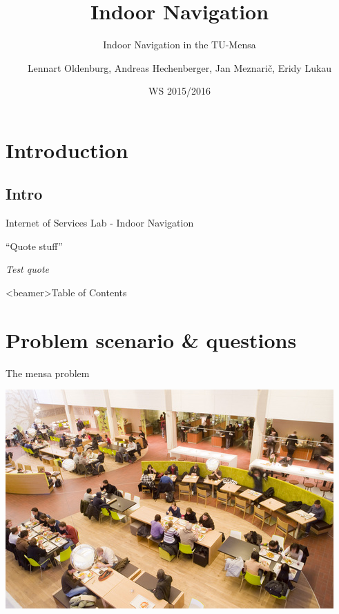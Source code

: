 \documentclass[9pt]{beamer}
\title[Internet of Services Lab]{Indoor Navigation}
\subtitle{Indoor Navigation in the TU-Mensa}
\author[Oldenburg, Hechenberger, Meznarič, Lukau]{Lennart Oldenburg, Andreas Hechenberger, Jan Meznarič, Eridy Lukau}
\institute[TU Berlin]{Department of Telecommunication Systems Service-centric Networking 
\\ Technische Universität Berlin}
\date[WS 2015/2016]{WS 2015/2016}
\newcommand{\englishQuote}[1]{``#1''}
\newcounter{currentOutline}
\begin{document}
\begin{frame}[plain]
	\titlepage
\end{frame}



\section*{Introduction} %

\subsection*{Intro}
\begin{frame}{Internet of Services Lab - Indoor Navigation}
	\begin{center}
	\englishQuote{Quote stuff}
\end{center}
	{\hfill\small\textit{Test quote} \cite{test:yeah}}
\end{frame}


\begin{frame}<beamer>{Table of Contents}
\tableofcontents[ 
	currentsection, %
	sectionstyle=show/show, %
]
\end{frame}





\section{Problem scenario \& questions}

\begin{frame}{The mensa problem}

	\begin{center}

		\includegraphics[width=.8\textwidth]{mensa}
	
	\end{center}

\end{frame}
\end{document}
